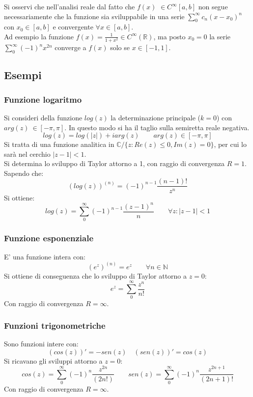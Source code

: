 \documentclass[twoside]{article}
\begin{document}
Si osservi che nell'analisi reale dal fatto che $f(x)$ $\in C^\infty[a,b]$ non segue necessariamente che la funzione sia sviluppabile in una serie $\sum_0^\infty c_n(x-x_0)^n$ con $x_0\in[a,b]$ e convergente $\forall x \in[a,b]$.\\
Ad esempio la funzione $f(x)=\frac{1}{1+x^2} \in C^\infty(\mathds{R})$, ma posto $x_0=0$ la serie $\sum_0^\infty(-1)^nx^{2n}$ converge a $f(x)$ solo se $x \in [-1,1]$.\\


\subsection{Esempi}
\subsubsection{Funzione logaritmo}
Si consideri della funzione $log(z)$ la determinazione principale ($k=0$) con $arg(z) \ \in[-\pi,\pi]$. In questo modo si ha il taglio sulla semiretta reale negativa.
\begin{equation}
    log(z)=log(|z|)+iarg(z) \qquad arg(z) \in[-\pi,\pi]
\end{equation}
Si tratta di una funzione analitica in $\mathds{C}/\{z:Re(z)\le 0, Im(z)=0\}$, per cui lo sarà nel cerchio $|z-1|<1$.\\
Si determina lo sviluppo di Taylor attorno a 1, con raggio di convergenza $R=1$.\\
Sapendo che:
\begin{equation}
    (log(z))^{(n)}=(-1)^{n-1}\frac{(n-1)!}{z^n}
\end{equation}
Si ottiene:
\begin{equation}
    log(z)=\sum_0^\infty (-1)^{n-1}\frac{(z-1)^n}{n} \qquad \forall z:|z-1|<1
\end{equation}
\subsubsection{Funzione esponenziale}
E' una funzione intera con:
\begin{equation}
    (e^z)^{(n)}=e^z \qquad \forall n\in \mathds{N}
\end{equation}
Si ottiene di conseguenza che lo sviluppo di Taylor attorno a $z=0$:
\begin{equation}
    e^z=\sum_0^\infty \frac{z^n}{n!}
\end{equation}
Con raggio di convergenza $R=\infty$.
\subsubsection{Funzioni trigonometriche}
Sono funzioni intere con:
\begin{equation}
    (cos(z))'=-sen(z) \quad (sen(z))'=cos(z)
\end{equation}
Si ricavano gli sviluppi attorno a $z=0$:
\begin{equation}
    cos(z)=\sum_0^\infty(-1)^n\frac{z^{2n}}{(2n!)}  \qquad
    sen(z)=\sum_0^\infty(-1)^n\frac{z^{2n+1}}{(2n+1)!}
\end{equation}
Con raggio di convergenza $R=\infty$.
\end{document}
